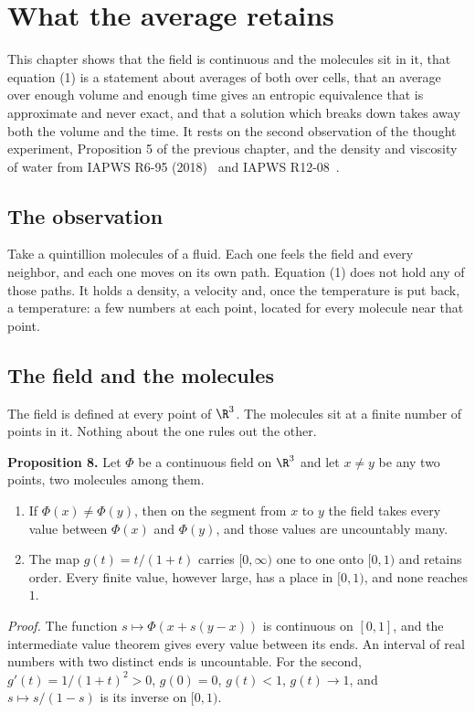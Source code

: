 \chapter{What the average retains}

This chapter shows that the field is continuous and the molecules sit in it, that equation (1) is
a statement about averages of both over cells, that an average over enough volume and enough time
gives an entropic equivalence that is approximate and never exact, and that a solution which breaks
down takes away both the volume and the time. It rests on the second observation of the thought
experiment, Proposition 5 of the previous chapter, and the density and viscosity of water from
IAPWS R6-95 (2018)~\cite{src:IAPWS-R6-95-2018} and IAPWS R12-08~\cite{src:IAPWS-R12-08}.

\section{The observation}

Take a quintillion molecules of a fluid. Each one feels the field and every neighbor, and each one
moves on its own path. Equation (1) does not hold any of those paths. It holds a density, a
velocity and, once the temperature is put back, a temperature: a few numbers at each point,
located for every molecule near that point.

\section{The field and the molecules}

The field is defined at every point of $\R^3$. The molecules sit at a finite number of points in it.
Nothing about the one rules out the other.

\textbf{Proposition 8.} Let $\Phi$ be a continuous field on $\R^3$ and let $x \neq y$ be any two
points, two molecules among them.
\begin{enumerate}
\item If $\Phi(x) \neq \Phi(y)$, then on the segment from $x$ to $y$ the field takes every value
between $\Phi(x)$ and $\Phi(y)$, and those values are uncountably many.
\item The map $g(t) = t/(1+t)$ carries $[0,\infty)$ one to one onto $[0,1)$ and retains order. Every
finite value, however large, has a place in $[0,1)$, and none reaches $1$.
\end{enumerate}

\emph{Proof.} The function $s \mapsto \Phi(x + s(y-x))$ is continuous on $[0,1]$, and the
intermediate value theorem gives every value between its ends. An interval of real numbers with
two distinct ends is uncountable. For the second, $g'(t) = 1/(1+t)^2 > 0$, $g(0) = 0$, $g(t) < 1$,
$g(t) \to 1$, and $s \mapsto s/(1-s)$ is its inverse on $[0,1)$. \hfill\qedsymbol

